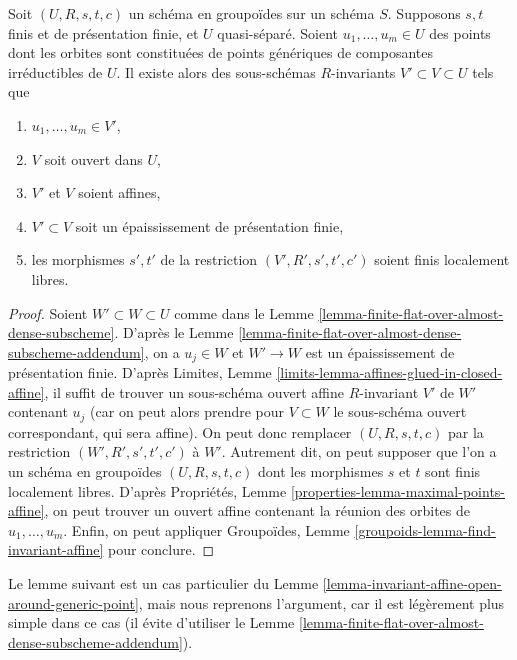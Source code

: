 \begin{lemma}
\label{lemma-invariant-affine-open-around-generic-point}
Soit $(U, R, s, t, c)$ un schéma en groupoïdes sur un schéma $S$. Supposons $s, t$
finis et de présentation finie, et $U$ quasi-séparé. Soient
$u_1, \ldots, u_m \in U$ des points dont les orbites sont constituées de points génériques
de composantes irréductibles de $U$. Il existe alors des sous-schémas $R$-invariants
$V' \subset V \subset U$ tels que
\begin{enumerate}
\item $u_1, \ldots, u_m \in V'$,
\item $V$ soit ouvert dans $U$,
\item $V'$ et $V$ soient affines,
\item $V' \subset V$ soit un épaississement de présentation finie,
\item les morphismes $s', t'$ de la restriction $(V', R', s', t', c')$
soient finis localement libres.
\end{enumerate}
\end{lemma}

\begin{proof}
Soient $W' \subset W \subset U$ comme dans le
Lemme \ref{lemma-finite-flat-over-almost-dense-subscheme}.
D'après le Lemme \ref{lemma-finite-flat-over-almost-dense-subscheme-addendum},
on a $u_j \in W$ et $W' \to W$ est un épaississement de présentation finie.
D'après Limites, Lemme \ref{limits-lemma-affines-glued-in-closed-affine},
il suffit de trouver un sous-schéma ouvert affine $R$-invariant
$V'$ de $W'$ contenant $u_j$ (car on peut alors prendre pour $V \subset W$
le sous-schéma ouvert correspondant, qui sera affine).
On peut donc remplacer $(U, R, s, t, c)$ par la restriction
$(W', R', s', t', c')$ à $W'$.
Autrement dit, on peut supposer que l'on a un schéma en groupoïdes $(U, R, s, t, c)$
dont les morphismes $s$ et $t$ sont finis localement libres.
D'après Propriétés, Lemme \ref{properties-lemma-maximal-points-affine},
on peut trouver un ouvert affine contenant la réunion des orbites de
$u_1, \ldots, u_m$. Enfin, on peut appliquer
Groupoïdes, Lemme \ref{groupoids-lemma-find-invariant-affine}
pour conclure.
\end{proof}

\noindent
Le lemme suivant est un cas particulier du
Lemme \ref{lemma-invariant-affine-open-around-generic-point},
mais nous reprenons l'argument, car il est légèrement plus simple dans ce cas
(il évite d'utiliser le
Lemme \ref{lemma-finite-flat-over-almost-dense-subscheme-addendum}).


